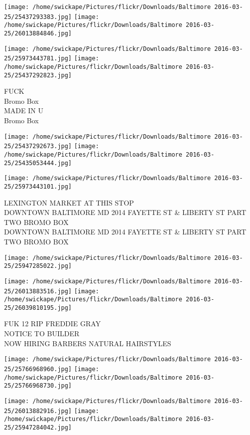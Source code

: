 \documentclass[10pt,letterpaper]{article}
\begin{document}
\texttt{[image: /home/swickape/Pictures/flickr/Downloads/Baltimore 2016-03-25/25437293383.jpg]}
\texttt{[image: /home/swickape/Pictures/flickr/Downloads/Baltimore 2016-03-25/26013884846.jpg]}

\texttt{[image: /home/swickape/Pictures/flickr/Downloads/Baltimore 2016-03-25/25973443781.jpg]}
\texttt{[image: /home/swickape/Pictures/flickr/Downloads/Baltimore 2016-03-25/25437292823.jpg]}

FUCK\\
Bromo Box\\
MADE IN U\\
Bromo Box\\
\pagebreak

\texttt{[image: /home/swickape/Pictures/flickr/Downloads/Baltimore 2016-03-25/25437292673.jpg]}
\texttt{[image: /home/swickape/Pictures/flickr/Downloads/Baltimore 2016-03-25/25435053444.jpg]}

\texttt{[image: /home/swickape/Pictures/flickr/Downloads/Baltimore 2016-03-25/25973443101.jpg]}

LEXINGTON MARKET AT THIS STOP\\
DOWNTOWN BALTIMORE MD 2014 FAYETTE ST \& LIBERTY ST PART TWO BROMO BOX\\
DOWNTOWN BALTIMORE MD 2014 FAYETTE ST \& LIBERTY ST PART TWO BROMO BOX\\
\pagebreak

\texttt{[image: /home/swickape/Pictures/flickr/Downloads/Baltimore 2016-03-25/25947285022.jpg]}

\vspace{0.25in}
\texttt{[image: /home/swickape/Pictures/flickr/Downloads/Baltimore 2016-03-25/26013883516.jpg]}
\texttt{[image: /home/swickape/Pictures/flickr/Downloads/Baltimore 2016-03-25/26039810195.jpg]}

FUK 12 RIP FREDDIE GRAY\\
NOTICE TO BUILDER\\
NOW HIRING BARBERS NATURAL HAIRSTYLES\\
\pagebreak

\texttt{[image: /home/swickape/Pictures/flickr/Downloads/Baltimore 2016-03-25/25766968960.jpg]}
\texttt{[image: /home/swickape/Pictures/flickr/Downloads/Baltimore 2016-03-25/25766968730.jpg]}

\texttt{[image: /home/swickape/Pictures/flickr/Downloads/Baltimore 2016-03-25/26013882916.jpg]}
\texttt{[image: /home/swickape/Pictures/flickr/Downloads/Baltimore 2016-03-25/25947284042.jpg]}
\end{document}
